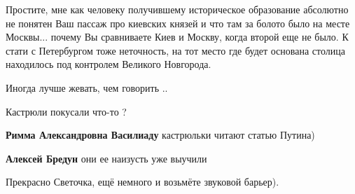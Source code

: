 \begin{itemize}
Простите, мне как человеку получившему историческое образование абсолютно не
понятен Ваш пассаж про киевских князей и что там за болото было на месте
Москвы... почему Вы сравниваете Киев и Москву, когда второй еще не было. К
стати с Петербургом тоже неточность, на тот место где будет основана столица
находилось под контролем Великого Новгорода.

 
Иногда лучше жевать, чем говорить ..

 
Кастрюли покусали что-то ?

\begin{itemize}
 
\textbf{Римма Александровна Василиаду} кастрюльки читают статью Путина)

 
\textbf{Алексей Бредун} они ее наизусть уже выучили
\end{itemize}

 

Прекрасно Светочка, ещё немного и возьмёте звуковой барьер).

 

\end{itemize}
